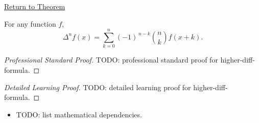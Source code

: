 \newpage
{}
\label{prf:higher-diff-formula}

\begin{remark*}[Return]
\hyperref[prop:higher-diff-formula]{Return to Theorem}
\end{remark*}

\begin{proposition*}
For any function \(f\),
\[
\Delta^n f(x)
=
\sum_{k=0}^{n} (-1)^{\,n-k}
\binom{n}{k}
f(x+k).
\]
\end{proposition*}

\begin{proof}[Professional Standard Proof]
\LRAProofBodyStart
TODO: professional standard proof for higher-diff-formula.
\end{proof}

\begin{proof}[Detailed Learning Proof]
\LRAProofBodyStart
TODO: detailed learning proof for higher-diff-formula.
\end{proof}

\begin{remark*}
\end{remark*}

\begin{dependencies}
\begin{itemize}
  \item TODO: list mathematical dependencies.
\end{itemize}
\end{dependencies}

\clearpage
